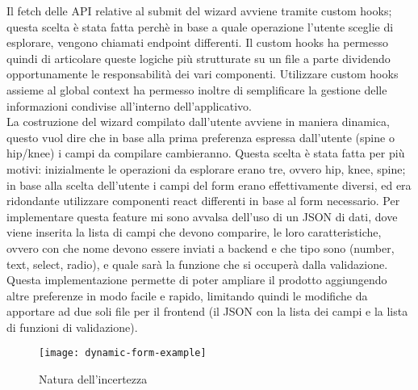Il fetch delle API relative al submit del wizard avviene tramite custom hooks; questa scelta è stata fatta perchè in base a quale operazione l'utente sceglie di esplorare, vengono chiamati endpoint differenti. Il custom hooks ha permesso quindi di articolare queste logiche più strutturate su un file a parte dividendo opportunamente le responsabilità dei vari componenti. Utilizzare custom hooks assieme al global context ha permesso inoltre di semplificare la gestione delle informazioni condivise all'interno dell'applicativo.\\

La costruzione del wizard compilato dall'utente avviene in maniera dinamica, questo vuol dire che in base alla prima preferenza espressa dall'utente (spine o hip/knee) i campi da compilare cambieranno. Questa scelta è stata fatta per più motivi: inizialmente le operazioni da esplorare erano tre, ovvero hip, knee, spine; in base alla scelta dell'utente i campi del form erano effettivamente diversi, ed era ridondante utilizzare componenti react differenti in base al form necessario. Per implementare questa feature mi sono avvalsa dell'uso di un JSON di dati, dove viene inserita la lista di campi che devono comparire, le loro caratteristiche, ovvero con che nome devono essere inviati a backend e che tipo sono (number, text, select, radio), e quale sarà la funzione che si occuperà dalla validazione. Questa implementazione permette di poter ampliare il prodotto aggiungendo altre preferenze in modo facile e rapido, limitando quindi le modifiche da apportare ad due soli file per il frontend (il JSON con la lista dei campi e la lista di funzioni di validazione). 

\begin{figure}[!ht] 
    \centering 
    \texttt{[image: dynamic-form-example]} 
    \caption{Natura dell'incertezza}
\end{figure}
